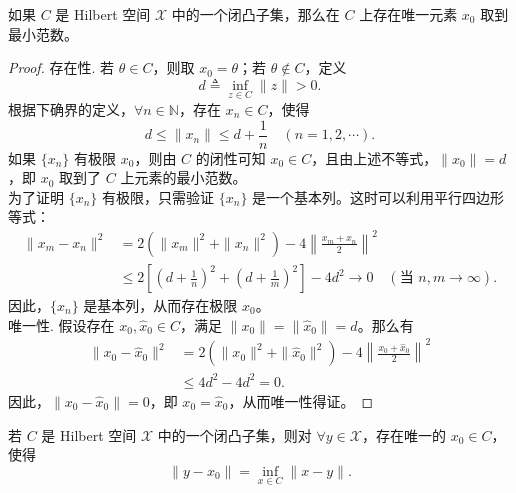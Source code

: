 \documentclass[lang=cn,newtx,10pt,scheme=chinese,thmcnt=chapter]{elegantbook}
\begin{document}
\begin{theorem}
如果 ${C}$ 是 Hilbert 空间 $\mathscr{X}$ 中的一个闭凸子集，那么在 ${C}$ 上存在唯一元素 $x_0$ 取到最小范数。
\end{theorem}
\begin{proof}
存在性. 若 $\theta \in {C}$，则取 $x_0 = \theta$；若 $\theta \notin {C}$，定义
\begin{equation*}
d \triangleq \inf_{z \in {C}} \|z\| > 0.
\end{equation*}
根据下确界的定义，$\forall n \in \mathbb{N}$，存在 $x_n \in {C}$，使得
\begin{equation*}
d \leqslant \|x_n\| \leqslant d + \frac{1}{n} \quad (n=1,2,\cdots).
\end{equation*}
如果 $\{x_n\}$ 有极限 $x_0$，则由 ${C}$ 的闭性可知 $x_0 \in {C}$，且由上述不等式，$\|x_0\| = d$，即 $x_0$ 取到了 ${C}$ 上元素的最小范数。\\
为了证明 $\{x_n\}$ 有极限，只需验证 $\{x_n\}$ 是一个基本列。这时可以利用平行四边形等式：
\begin{equation*}
\begin{aligned}
\|x_m - x_n\|^2 &= 2\left(\|x_m\|^2 + \|x_n\|^2\right) - 4\left\|\frac{x_m + x_n}{2}\right\|^2 \\
&\leqslant 2\left[\left(d + \frac{1}{n}\right)^2 + \left(d + \frac{1}{m}\right)^2\right] - 4d^2 \rightarrow 0 \quad (\text{当 } n, m \rightarrow \infty).
\end{aligned}
\end{equation*}
因此，$\{x_n\}$ 是基本列，从而存在极限 $x_0$。\\
唯一性. 假设存在 $x_0, \widehat{x}_0 \in {C}$，满足 $\|x_0\| = \|\widehat{x}_0\| = d$。那么有
\begin{equation*}
\begin{aligned}
\|x_0 - \widehat{x}_0\|^2 &= 2\left(\|x_0\|^2 + \|\widehat{x}_0\|^2\right) - 4\left\|\frac{x_0 + \widehat{x}_0}{2}\right\|^2 \\
&\leqslant 4d^2 - 4d^2 = 0.
\end{aligned}
\end{equation*}
因此，$\|x_0 - \widehat{x}_0\| = 0$，即 $x_0 = \widehat{x}_0$，从而唯一性得证。
\end{proof}
\begin{corollary}
若 ${C}$ 是 Hilbert 空间 $\mathscr{X}$ 中的一个闭凸子集，则对 $\forall y \in \mathscr{X}$，存在唯一的 $x_0 \in{C}$，使得
\begin{equation*}
\|y - x_0\| = \inf_{x \in {C}} \|x - y\|.
\end{equation*}
\end{corollary}
\end{document}
